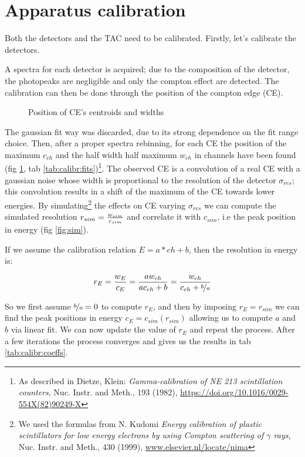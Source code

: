 \documentclass[11pt,a4 paper]{article}
\let\oldfrac\frac
\renewcommand{\frac}[3][d]{\ifthenelse{\equal{#1}{d}}{\oldfrac{#2}{#3}}{\nicefrac{#2}{#3}}}
\begin{document}
\section{Apparatus calibration}
Both the detectors and the TAC need to be calibrated. Firstly, let's calibrate the detectors.

A spectra for each detector is acquired; due to the composition of the detector, the photopeaks are negligible and only the compton effect are detected. The calibration can then be done through the position of the compton edge (CE).

\begin{figure}[H]
    \centering
    \caption{Position of CE's centroids and widths}
    \label{fig:det1:calibr}
\end{figure}

The gaussian fit way was discarded, due to its strong dependence on the fit range choice. Then, after a proper spectra rebinning, for each CE the position of the maximum $c_{ch}$ and the half width half maximum $w_{ch}$ in channels have been found (fig \ref{fig:det1:calibr}, tab \ref{tab:calibr:fits})\footnote{As described in Dietze, Klein: \emph{Gamma-calibration of NE 213 scintillation counters}, Nuc. Instr. and Meth., 193 (1982), \url{https://doi.org/10.1016/0029-554X(82)90249-X}}.
The observed CE is a convolution of a real CE with a gaussian noise whose width is proportional to the resolution of the detector $\sigma_{res}$; this convolution results in a shift of the maximum of the CE towards lower energies. By simulating\footnote{We used the formulas from N. Kudomi \emph{Energy calibration of plastic scintillators for low energy electrons by using Compton scattering of $\gamma$ rays}, Nuc. Instr. and Meth., 430 (1999), \url{www.elsevier.nl/locate/nima}} the effects on CE varying $\sigma_{res}$ we can compute the simulated resolution $r_{sim} = \frac{w_{sim}}{c_{sim}}$ and correlate it with $c_{sim}$, i.e the peak position in energy (fig \ref{fig:sim}).

If we assume the calibration relation $E = a*ch + b$, then the resolution in energy is:

\begin{equation*}
  r_E = \frac{w_E}{c_E} = \frac{a w_{ch}}{a c_{ch} + b} = \frac{w_{ch}}{c_{ch} + \frac[f]{b}{a}}
\end{equation*}

So we first assume $\frac[f]{b}{a} = 0$ to compute $r_E$, and then by imposing $r_E = r_{sim}$ we can find the peak positions in energy $c_E = c_{sim}(r_{sim})$ allowing us to compute $a$ and $b$ via linear fit. We can now update the value of $r_E$ and repeat the process. After a few iterations the process converges and gives us the results in tab \ref{tab:calibr:coeffs}.
\end{document}
